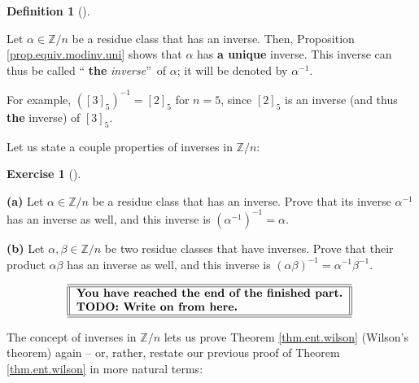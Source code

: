\documentclass[numbers=enddot,12pt,final,onecolumn,notitlepage]{scrartcl}%
\newcounter{exer}
\numberwithin{exer}{subsection}
\theoremstyle{definition}
\newtheorem{defi}[theo]{Definition}
\newenvironment{definition}[1][]
{\begin{defi}[#1]\begin{leftbar}}
{\end{leftbar}\end{defi}}
\newtheorem{exmp}[exer]{Exercise}
\newenvironment{exercise}[1][]
{\begin{exmp}[#1]\begin{leftbar}}
{\end{leftbar}\end{exmp}}
\begin{document}
\begin{definition}
Let $\alpha\in\mathbb{Z}/n$ be a residue class that has an inverse. Then,
Proposition \ref{prop.equiv.modinv.uni} shows that $\alpha$ has \textbf{a
unique} inverse. This inverse can thus be called \textquotedblleft%
\textbf{the}\textit{ inverse}\textquotedblright\ of $\alpha$; it will be
denoted by $\alpha^{-1}$.
\end{definition}

For example, $\left(  \left[  3\right]  _{5}\right)  ^{-1}=\left[  2\right]
_{5}$ for $n=5$, since $\left[  2\right]  _{5}$ is an inverse (and thus
\textbf{the} inverse) of $\left[  3\right]  _{5}$.

Let us state a couple properties of inverses in $\mathbb{Z}/n$:

\begin{exercise}
\label{exe.equiv.modinv.ab}\textbf{(a)} Let $\alpha\in\mathbb{Z}/n$ be a
residue class that has an inverse. Prove that its inverse $\alpha^{-1}$ has an
inverse as well, and this inverse is $\left(  \alpha^{-1}\right)  ^{-1}%
=\alpha$.

\textbf{(b)} Let $\alpha,\beta\in\mathbb{Z}/n$ be two residue classes that
have inverses. Prove that their product $\alpha\beta$ has an inverse as well,
and this inverse is $\left(  \alpha\beta\right)  ^{-1}=\alpha^{-1}\beta^{-1}$.
\end{exercise}

%

\[%
\begin{tabular}
[c]{||l||}\hline\hline
\textbf{You have reached the end of the finished part.}\\
\textbf{TODO: Write on from here.}\\\hline\hline
\end{tabular}
\
\]


The concept of inverses in $\mathbb{Z}/n$ lets us prove Theorem
\ref{thm.ent.wilson} (Wilson's theorem) again -- or, rather, restate our
previous proof of Theorem \ref{thm.ent.wilson} in more natural terms:
\end{document}
